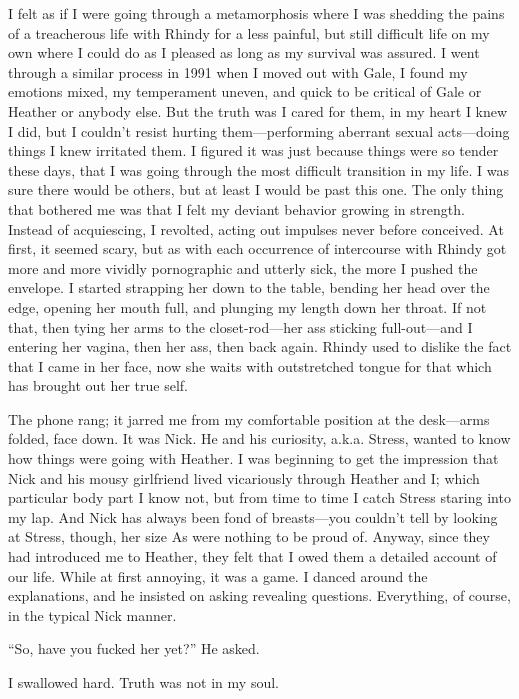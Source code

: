 I felt as if I were going through a metamorphosis where I was shedding
the pains of a treacherous life with Rhindy for a less painful, but
still difficult life on my own where I could do as I pleased as long as
my survival was assured. I went through a similar process in 1991 when I
moved out with Gale, I found my emotions mixed, my temperament uneven,
and quick to be critical of Gale or Heather or anybody else. But the
truth was I cared for them, in my heart I knew I did, but I couldn't
resist hurting them---performing aberrant sexual acts---doing things I
knew irritated them. I figured it was just because things were so tender
these days, that I was going through the most difficult transition in my
life. I was sure there would be others, but at least I would be past
this one. The only thing that bothered me was that I felt my deviant
behavior growing in strength. Instead of acquiescing, I revolted, acting
out impulses never before conceived. At first, it seemed scary, but as
with each occurrence of intercourse with Rhindy got more and more
vividly pornographic and utterly sick, the more I pushed the envelope. I
started strapping her down to the table, bending her head over the edge,
opening her mouth full, and plunging my length down her throat. If not
that, then tying her arms to the closet-rod---her ass sticking
full-out---and I entering her vagina, then her ass, then back again.
Rhindy used to dislike the fact that I came in her face, now she waits
with outstretched tongue for that which has brought out her true self.

The phone rang; it jarred me from my comfortable position at the
desk---arms folded, face down. It was Nick. He and his curiosity, a.k.a.
Stress, wanted to know how things were going with Heather. I was
beginning to get the impression that Nick and his mousy girlfriend lived
vicariously through Heather and I; which particular body part I know
not, but from time to time I catch Stress staring into my lap. And Nick
has always been fond of breasts---you couldn't tell by looking at
Stress, though, her size As were nothing to be proud of. Anyway, since
they had introduced me to Heather, they felt that I owed them a detailed
account of our life. While at first annoying, it was a game. I danced
around the explanations, and he insisted on asking revealing questions.
Everything, of course, in the typical Nick manner.

``So, have you fucked her yet?'' He asked.

I swallowed hard. Truth was not in my soul.

